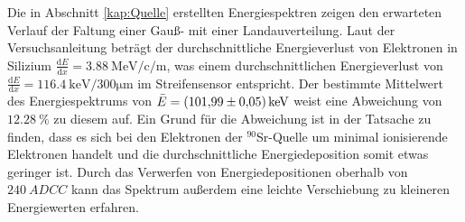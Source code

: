 Die in Abschnitt \ref{kap:Quelle} erstellten Energiespektren zeigen den erwarteten Verlauf der Faltung einer Gauß- mit einer Landauverteilung. Laut der Versuchsanleitung \cite{anleitung} beträgt der durchschnittliche Energieverlust von Elektronen in Silizium $\frac{\mathrm{d}E}{\mathrm{d}x} = \SI{3.88}{\mega\electronvolt\per\centi \per \metre}$, was einem durchschnittlichen Energieverlust von $\frac{\mathrm{d}E}{\mathrm{d}x} = \SI{116.4}{\kilo\electronvolt\per 300 \micro \metre}$ im Streifensensor entspricht. Der bestimmte Mittelwert des Energiespektrums von $\bar{E} = \SI{101.99 \pm 0.05}{\kilo\electronvolt}$ weist eine Abweichung von $\SI{12.28}{\%}$ zu diesem auf. Ein Grund für die Abweichung ist in der Tatsache zu finden, dass es sich bei den Elektronen der $^{90}$Sr-Quelle um minimal ionisierende Elektronen handelt und die durchschnittliche Energiedeposition somit etwas geringer ist. Durch das Verwerfen von Energiedepositionen oberhalb von $\SI{240}{ADCC}$ kann das Spektrum außerdem eine leichte Verschiebung zu kleineren Energiewerten erfahren.





